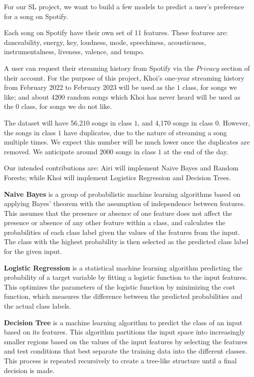 For our SL project, we want to build a few models to predict a user's preference for a song on Spotify. 

Each song on Spotify have their own set of 11 features. These features are: danceability, energy, key, loudness,
mode, speechiness, acousticness, instrumentalness, liveness, valence, and tempo.

A user can request their streaming history from Spotify via the $Privacy$ section of their account. For the purpose
of this project, Khoi's one-year streaming history from February 2022 to February 2023 will be used as the $1$ class, for songs we like; and about
4200 random songs which Khoi has never heard will be used as the $0$ class, for songs we do not like.

The dataset will have 56,210 songs in class $1$, and 4,170 songs in class $0$. However, the songs in class $1$ have duplicates, due to the nature of streaming
a song multiple times. We expect this number will be much lower once the duplicates are removed. We anticipate around $2000$ songs in class $1$ at the end of the day.

Our intended contributions are: Airi will implement Naive Bayes and Random Forests; while Khoi will implement Logistics Regression and Decision Trees.

\textbf{Naive Bayes} is a group of probabilistic machine learning algorithms based on applying Bayes' theorem with the assumption of independence between features.
This assumes that the presence or absence of one feature does not affect the presence or absence of any other feature within a class,
and calculates the probabilities of each class label given the values of the features from the input. The class with the highest probability is then selected as the predicted class label for the given input.

\textbf{Logistic Regression} is a statistical machine learning algorithm predicting the probability of a target variable by fitting a logistic function to the input features. 
This optimizes the parameters of the logistic function by minimizing the cost function, which measures the difference between the predicted probabilities and the actual class labels.

\textbf{Decision Tree} is a machine learning algorithm to predict the class of an input based on its features.  
This algorithm partitions the input space into increasingly smaller regions based on the values of the input features by selecting the features and test conditions that best separate the training data into the different classes.
This process is repeated recursively to create a tree-like structure until a final decision is made. 

